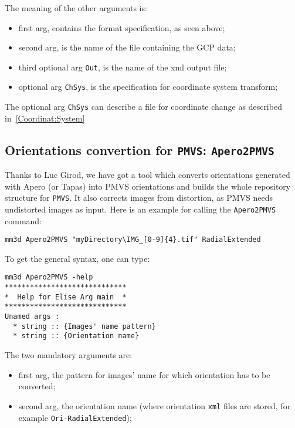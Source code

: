 \vspace{\baselineskip}
The meaning of the other arguments is:

\begin{itemize}
    \item first arg, contains the format specification, as seen above;
    \item second arg, is the name of the file containing the GCP data;
    \item third optional arg {\tt Out}, is the name of the xml output file;
    \item optional arg {\tt ChSys}, is the specification for coordinate system transform;
\end{itemize}
\vspace{\baselineskip}
The optional arg {\tt ChSys} can describe a file for coordinate change as described in~\ref{Coordinat:System}


\subsection{Orientations convertion for {\tt PMVS}: {\tt Apero2PMVS} }

Thanks to Luc Girod, we have got a tool which converts orientations generated with Apero (or Tapas) into PMVS orientations and builds the whole repository structure for {\tt PMVS}.
It also corrects images from distortion, as PMVS needs undistorted images as input.
Here is an example for calling the {\tt Apero2PMVS} command:

\begin{verbatim}
mm3d Apero2PMVS "myDirectory\IMG_[0-9]{4}.tif" RadialExtended
\end{verbatim}

To get the general syntax, one can type:

\begin{verbatim}
mm3d Apero2PMVS -help
*****************************
*  Help for Elise Arg main  *
*****************************
Unamed args :
  * string :: {Images' name pattern}
  * string :: {Orientation name}
\end{verbatim}

The two mandatory arguments are:
\begin{itemize}
    \item first arg, the pattern for images' name for which orientation has to be converted;
    \item second arg, the orientation name (where orientation {\tt xml} files are stored, for example {\tt Ori-RadialExtended});
\end{itemize}

